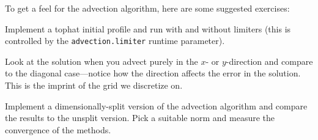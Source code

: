 To get a feel for the advection algorithm, here are some suggested
exercises:

\begin{exercise}
{Implement a tophat initial profile and run with and without limiters
  (this is controlled by the {\tt advection.limiter} runtime
  parameter).}
\end{exercise}

\begin{exercise}
{Look at the solution when you advect purely in the $x$- or
  $y$-direction and compare to the diagonal case---notice how the
  direction affects the error in the solution.  This is the imprint
  of the grid we discretize on.}
\end{exercise}

\begin{exercise}
{Implement a dimensionally-split version of the advection algorithm
and compare the results to the unsplit version.  Pick a suitable norm
and measure the convergence of the methods.}
\end{exercise}
